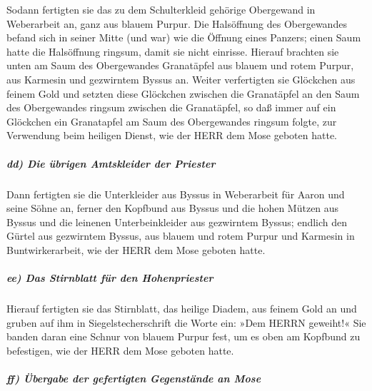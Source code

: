  Sodann fertigten sie das zu dem Schulterkleid gehörige
Obergewand in Weberarbeit an, ganz aus blauem Purpur. 
Die Halsöffnung des Obergewandes befand sich in seiner Mitte (und war)
wie die Öffnung eines Panzers; einen Saum hatte die Halsöffnung ringsum,
damit sie nicht einrisse.  Hierauf brachten sie unten am
Saum des Obergewandes Granatäpfel aus blauem und rotem Purpur, aus
Karmesin und gezwirntem Byssus an.  Weiter verfertigten
sie Glöckchen aus feinem Gold und setzten diese Glöckchen zwischen die
Granatäpfel an den Saum des Obergewandes ringsum zwischen die
Granatäpfel,  so daß immer auf ein Glöckchen ein
Granatapfel am Saum des Obergewandes ringsum folgte, zur Verwendung beim
heiligen Dienst, wie der HERR dem Mose geboten hatte.

\hypertarget{dd-die-uxfcbrigen-amtskleider-der-priester}{%
\subparagraph{dd) Die übrigen Amtskleider der
Priester}\label{dd-die-uxfcbrigen-amtskleider-der-priester}}

 Dann fertigten sie die Unterkleider aus Byssus in
Weberarbeit für Aaron und seine Söhne an,  ferner den
Kopfbund aus Byssus und die hohen Mützen aus Byssus und die leinenen
Unterbeinkleider aus gezwirntem Byssus;  endlich den
Gürtel aus gezwirntem Byssus, aus blauem und rotem Purpur und Karmesin
in Buntwirkerarbeit, wie der HERR dem Mose geboten hatte.

\hypertarget{ee-das-stirnblatt-fuxfcr-den-hohenpriester}{%
\subparagraph{ee) Das Stirnblatt für den
Hohenpriester}\label{ee-das-stirnblatt-fuxfcr-den-hohenpriester}}

 Hierauf fertigten sie das Stirnblatt, das heilige
Diadem, aus feinem Gold an und gruben auf ihm in Siegelstecherschrift
die Worte ein: »Dem HERRN geweiht!«  Sie banden daran
eine Schnur von blauem Purpur fest, um es oben am Kopfbund zu
befestigen, wie der HERR dem Mose geboten hatte.

\hypertarget{ff-uxfcbergabe-der-gefertigten-gegenstuxe4nde-an-mose}{%
\subparagraph{ff) Übergabe der gefertigten Gegenstände an
Mose}\label{ff-uxfcbergabe-der-gefertigten-gegenstuxe4nde-an-mose}}

